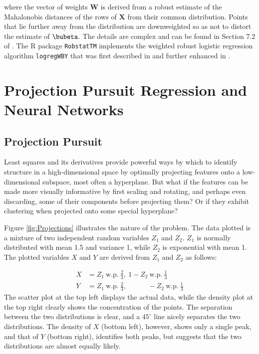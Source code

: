 \documentclass[graybox,envcountchap,sectrefs]{svmono}\usepackage[]{graphicx}\usepackage[]{xcolor}
\begin{document}
\begin{appendices}
where the vector of weights $\mathbf{W}$ is derived from a robust
estimate of the Mahalonobis distances of the rows of $\mathbf{X}$
from their common distribution. Points that lie further away from
the distribution are downweighted so as not to distort the estimate
of $\bubeta$. The details are complex and can be found in Section
7.2 of \citet{Maronna2019}. The R package \texttt{RobstatTM} implements
the weighted robust logistic regression algorithm \texttt{logregWBY}
that was first described in \citet{BiancoYohai1996} and further enhanced
in \citet{CrouxHaesbroeck2003}.

\section{Projection Pursuit Regression and Neural Networks}

\subsection{Projection Pursuit }

Least squares and its derivatives provide powerful ways by which to
identify structure in a high-dimensional space by optimally projecting
features onto a low-dimensional subspace, most often a hyperplane.
But what if the features can be made more visually informative by
first scaling and rotating, and perhaps even discarding, some of their
components before projecting them? Or if they exhibit clustering when
projected onto some special hyperplane? 

Figure \ref{fig:Projections} illustrates the nature of the problem.
The data plotted is a mixture of two independent random variables
$Z_{1}$ and $Z_{2}$. $Z_{1}$ is normally distributed with mean
1.5 and variance 1, while $Z_{2}$ is exponential with mean 1. The
plotted variables $X$ and $Y$ are derived from $Z_{1}$ and $Z_{2}$
as follows:

\begin{align*}
X & =Z_{1}\ \mathrm{w.p.}\ \frac{2}{3},\ 1-Z_{2}\ \mathrm{w.p}.\ \frac{1}{3}\\
Y & =Z_{1}\ \mathrm{w.p.}\ \frac{2}{3},\ \phantom{1-Z_{2}}-Z_{2}\ \mathrm{w.p}.\ \frac{1}{3}
\end{align*}
The scatter plot at the top left displays the actual data, while the
density plot at the top right clearly shows the concentration of the
points. The separation between the two distributions is clear, and
a $45^{\circ}$ line nicely separates the two distributions. The density
of $X$ (bottom left), however, shows only a single peak, and that
of $Y$ (bottom right), identifies both peaks, but suggests that the
two distributions are almost equally likely.


\end{appendices}
\end{document}
